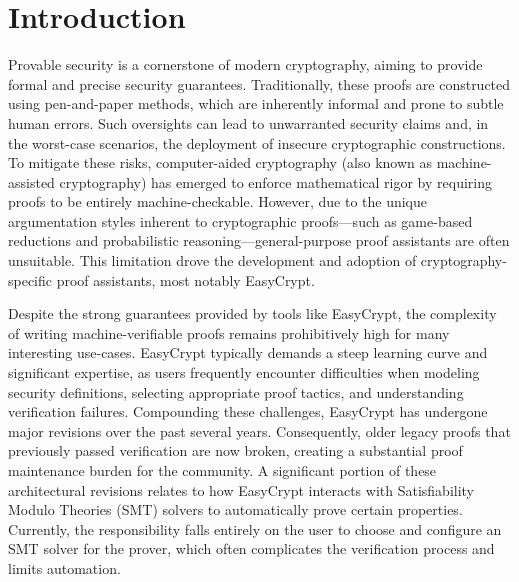 \documentclass[acmsmall,natbib=false]{acmart}
\begin{document}
\maketitle

\section{Introduction}
Provable security is a cornerstone of modern cryptography, aiming to provide formal and precise security guarantees. Traditionally, these proofs are constructed using pen-and-paper methods, which are inherently informal and prone to subtle human errors. Such oversights can lead to unwarranted security claims and, in the worst-case scenarios, the deployment of insecure cryptographic constructions. To mitigate these risks, computer-aided cryptography (also known as machine-assisted cryptography) has emerged to enforce mathematical rigor by requiring proofs to be entirely machine-checkable. However, due to the unique argumentation styles inherent to cryptographic proofs—such as game-based reductions and probabilistic reasoning—general-purpose proof assistants are often unsuitable. This limitation drove the development and adoption of cryptography-specific proof assistants, most notably EasyCrypt.

Despite the strong guarantees provided by tools like EasyCrypt, the complexity of writing machine-verifiable proofs remains prohibitively high for many interesting use-cases. EasyCrypt typically demands a steep learning curve and significant expertise, as users frequently encounter difficulties when modeling security definitions, selecting appropriate proof tactics, and understanding verification failures. Compounding these challenges, EasyCrypt has undergone major revisions over the past several years. Consequently, older legacy proofs that previously passed verification are now broken, creating a substantial proof maintenance burden for the community. A significant portion of these architectural revisions relates to how EasyCrypt interacts with Satisfiability Modulo Theories (SMT) solvers to automatically prove certain properties. Currently, the responsibility falls entirely on the user to choose and configure an SMT solver for the prover, which often complicates the verification process and limits automation.
\end{document}
